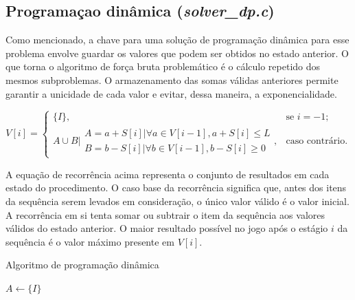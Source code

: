 \documentclass[10pt,a4paper]{article}
\numberwithin{equation}{section}
\begin{document}
\subsection{Programaçao dinâmica (\emph{solver\_dp.c})}

Como mencionado, a chave para uma solução de programação dinâmica para esse problema envolve guardar os valores que podem ser obtidos no estado anterior. O que torna o algoritmo de força bruta problemático é o cálculo repetido dos mesmos subproblemas. O armazenamento das somas válidas anteriores permite garantir a unicidade de cada valor e evitar, dessa maneira, a exponencialidade.

\begin{equation}
    V[i]=\begin{cases}
        \{I\}, & \text{se $i = -1$;}\\
        A \cup B \vert \begin{array}{ll}
        	A = a + S[i] \vert \forall a \in V[i-1], a + S[i] \le L \\
        	B = b - S[i] \vert \forall b \in V[i-1], b - S[i] \ge 0
        \end{array}, & \text{caso contrário.}
    \end{cases}
\end{equation}

A equação de recorrência acima representa o conjunto de resultados em cada estado do procedimento. O caso base da recorrência significa que, antes dos itens da sequência serem levados em consideração, o único valor válido é o valor inicial. A recorrência em si tenta somar ou subtrair o item da sequência aos valores válidos do estado anterior. O maior resultado possível no jogo após o estágio $i$ da sequência é o valor máximo presente em $V[i]$.

\begin{algorithm}[H]
    \caption{Algoritmo de programação dinâmica}


    \BlankLine
    $A \gets \{I\}$\;
\end{algorithm}
\end{document}
